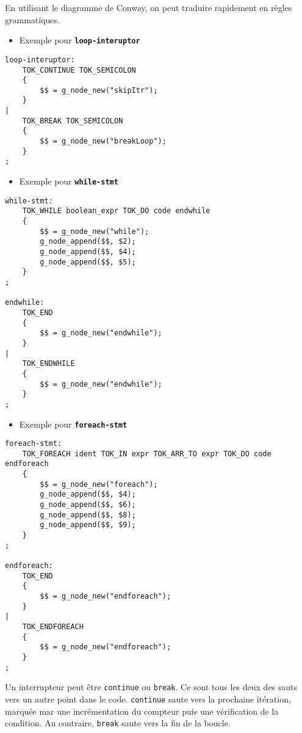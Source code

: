 \documentclass[11pt]{article}
\providecommand{\tightlist}{%
      \setlength{\itemsep}{0pt}\setlength{\parskip}{0pt}}
\begin{document}
En utilisant le diagramme de Conway, on peut traduire rapidement en
règles grammatiques.

\begin{itemize}
\tightlist
\item
  Exemple pour \textbf{\texttt{loop-interuptor}}
\end{itemize}

\begin{verbatim}
loop-interuptor:
    TOK_CONTINUE TOK_SEMICOLON
    {
        $$ = g_node_new("skipItr");
    }
|
    TOK_BREAK TOK_SEMICOLON
    {
        $$ = g_node_new("breakLoop");
    }
;
\end{verbatim}

\begin{itemize}
\tightlist
\item
  Exemple pour \textbf{\texttt{while-stmt}}
\end{itemize}

\begin{verbatim}
while-stmt:
    TOK_WHILE boolean_expr TOK_DO code endwhile
    {
        $$ = g_node_new("while");
        g_node_append($$, $2);
        g_node_append($$, $4);
        g_node_append($$, $5);
    }
;

endwhile:
    TOK_END
    {
        $$ = g_node_new("endwhile");
    }
|
    TOK_ENDWHILE
    {
        $$ = g_node_new("endwhile");
    }
;
\end{verbatim}

\begin{itemize}
\tightlist
\item
  Exemple pour \textbf{\texttt{foreach-stmt}}
\end{itemize}

\begin{verbatim}
foreach-stmt:
    TOK_FOREACH ident TOK_IN expr TOK_ARR_TO expr TOK_DO code endforeach
    {
        $$ = g_node_new("foreach");
        g_node_append($$, $4);
        g_node_append($$, $6);
        g_node_append($$, $8);
        g_node_append($$, $9);
    }
;

endforeach:
    TOK_END
    {
        $$ = g_node_new("endforeach");
    }
|
    TOK_ENDFOREACH
    {
        $$ = g_node_new("endforeach");
    }
;
\end{verbatim}

    Un interrupteur peut être \texttt{continue} ou \texttt{break}. Ce sont
tous les deux des sauts vers un autre point dans le code.
\texttt{continue} saute vers la prochaine itération, marquée mar une
incrémentation du compteur puis une vérification de la condition. Au
contraire, \texttt{break} saute vers la fin de la boucle.
\end{document}
